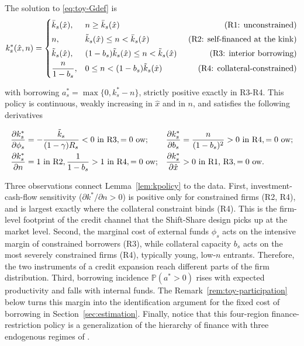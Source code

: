 \documentclass[12pt]{article}
\begin{document}
\begin{lemma}
\label{lem:kpolicy}
The solution to \eqref{eq:toy-Gdef} is
\begin{equation}
  k^{*}_{s}(\hat x,n)=
  \begin{cases}
    \bar{k}_{s}(\hat x), & n \geq \bar{k}_{s}(\hat x)
      \hfill \text{(R1: unconstrained)}\\[3pt]
    n, & \tilde{k}_{s}(\hat x) \le n < \bar{k}_{s}(\hat x)
      \hfill \text{(R2: self-financed at the kink)}\\[3pt]
    \tilde{k}_{s}(\hat x), &
      (1-b_{s})\tilde{k}_{s}(\hat x) \le n <
      \tilde{k}_{s}(\hat x)
      \hfill \qquad \qquad \text{(R3: interior borrowing)}\\[3pt]
    \dfrac{n}{1-b_{s}}, &
      0\le n < (1-b_{s})\tilde{k}_{s}(\hat x)
      \hfill \text{(R4: collateral-constrained)}
  \end{cases}
  \label{eq:toy-kpolicy}
\end{equation}

with borrowing $a^{*}_{s}=\max\{0,k^{*}_{s}-n\}$, strictly positive exactly in R3-R4. This policy is continuous, weakly increasing in $\hat x$ and in $n$, and satisfies the following derivatives

\begin{align}
  \frac{\partial k^{*}_{s}}{\partial \phi_{s}} &=
    -\frac{\tilde{k}_{s}}{(1-\gamma)R_{s}} < 0 \ \text{in R3},
    = 0 \ \text{ow};
  &
  \frac{\partial k^{*}_{s}}{\partial b_{s}} &=
    \frac{n}{(1-b_{s})^{2}} > 0 \ \text{in R4},
    =0 \ \text{ow};
  \notag \\
  \frac{\partial k^{*}_{s}}{\partial n} &= 1 \ \text{in R2},
  \frac{1}{1-b_{s}}>1 \ \text{in R4},
  =0 \ \text{ow};
  &
  \frac{\partial k^{*}_{s}}{\partial \hat x} &> 0
   \ \text{in R1, R3},  =0 \ \text{ow}.
  \label{eq:toy-ksigns}
\end{align}
\end{lemma}
 
Three observations connect Lemma~\ref{lem:kpolicy} to the data. First, investment-cash-flow sensitivity ($\partial k^{*}/\partial n>0$) is positive only for constrained firms (R2, R4), and is largest exactly where the collateral constraint binds (R4). This is the firm-level footprint of the credit channel that the Shift-Share design picks up at the market level. Second, the marginal cost of external funds $\phi_{s}$ acts on the intensive margin of constrained borrowers (R3), while collateral capacity $b_{s}$ acts on the most severely constrained firms (R4), typically young, low-$n$ entrants. Therefore, the two instruments of a credit expansion reach different parts of the firm distribution. Third, borrowing incidence $\mathbb{P}(a^{*}>0)$ rises with expected productivity and falls with internal funds. The Remark~\ref{rem:toy-participation} below turns this margin into the identification argument for the fixed cost of borrowing in Section~\ref{sec:estimation}. Finally, notice that this four-region finance-restriction policy is a generalization of the hierarchy of finance with three endogenous regimes of \cite{bond1994dynamic}.
 
\end{document}
